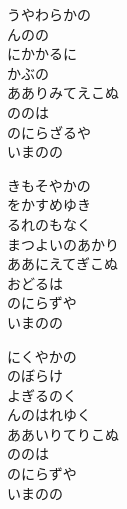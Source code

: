 \documentclass[10pt,b5j]{tarticle} %
\begin{document}
\vspace{1.5em} %
\newcommand{\linespace}{0.5em} %
\newcommand{\blocksize}{0.5\hsize} %
\begin{enumerate} %
    \begin{minipage}[c]{\blocksize}
    
        \vspace{\linespace}
        \item
        うやわらかの\\
        んのの\\
        にかかるに\\
        かぶの\\
        あありみてえこぬ\\
        ののは\\
        のにらざるや\\
        いまのの
        
        \vspace{\linespace}
        \item
        きもそやかの\\
        をかすめゆき\\
        るれのもなく\\
        まつよいのあかり\\
        ああにえてぎこぬ\\
        おどるは\\
        のにらずや\\
        いまのの
        
        \vspace{\linespace}
        \item
        にくやかの\\
        のぼらけ\\
        よぎるのく\\
        んのはれゆく\\
        ああいりてりこぬ\\
        ののは\\
        のにらずや\\
        いまのの
        

\end{minipage}
\end{enumerate}
\end{document}
